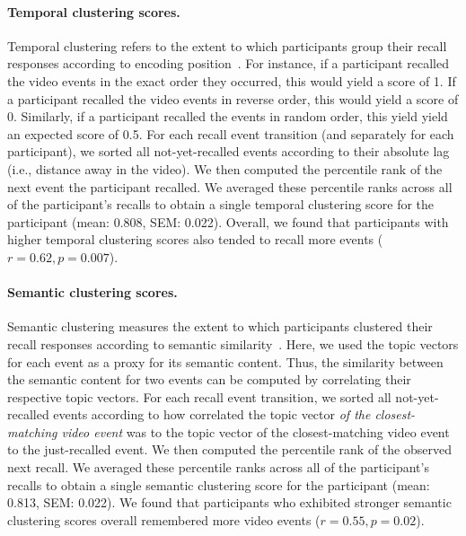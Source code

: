 \documentclass{article}
\begin{document}
\paragraph{Temporal clustering scores.} Temporal clustering refers to the extent to which participants group their recall responses according to encoding position~\citep{PolyEtal09}. For instance, if a participant recalled the video events in the exact order they occurred, this would yield a score of 1.  If a participant recalled the video events in reverse order, this would yield a score of 0.  Similarly, if a participant recalled the events in random order, this yield yield an expected score of 0.5.  For each recall event transition (and separately for each participant), we sorted all not-yet-recalled events according to their absolute lag (i.e., distance away in the video).  We then computed the percentile rank of the next event the participant recalled.  We averaged these percentile ranks across all of the participant's recalls to obtain a single temporal clustering score for the participant (mean: 0.808, SEM: 0.022).  Overall, we found that participants with higher temporal clustering scores also tended to recall more events ($r = 0.62, p = 0.007$).

\paragraph{Semantic clustering scores.} Semantic clustering measures the extent to which participants clustered their recall responses according to semantic similarity~\citep{PolyEtal09}. Here, we used the topic vectors for each event as a proxy for its semantic content. Thus, the similarity between the semantic content for two events can be computed by correlating their respective topic vectors.  For each recall event transition, we sorted all not-yet-recalled events according to how correlated the topic vector \textit{of the closest-matching video event} was to the topic vector of the closest-matching video event to the just-recalled event.  We then computed the percentile rank of the observed next recall.  We averaged these percentile ranks across all of the participant's recalls to obtain a single semantic clustering score for the participant (mean: 0.813, SEM: 0.022).  We found that participants who exhibited stronger semantic clustering scores overall remembered more video events ($r = 0.55, p = 0.02$).
\end{document}

